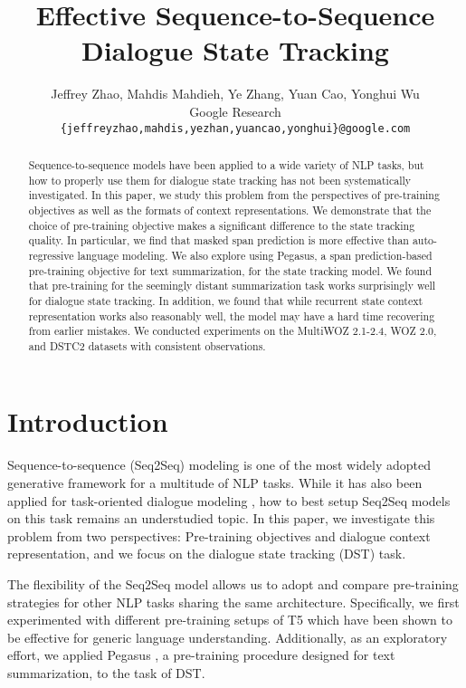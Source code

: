 \documentclass[11pt]{article}
\title{Effective Sequence-to-Sequence Dialogue State Tracking}
\author{Jeffrey Zhao, Mahdis Mahdieh, Ye Zhang, Yuan Cao, Yonghui Wu 
\\
Google Research\\
\texttt{\{jeffreyzhao,mahdis,yezhan,yuancao,yonghui\}@google.com} \\
}
\begin{document}
\maketitle
\begin{abstract}
Sequence-to-sequence models have been applied to a wide variety of NLP tasks, but how to properly use them for dialogue state tracking has not been systematically investigated. In this paper, we study this problem from the perspectives of pre-training objectives as well as the formats of context representations. We demonstrate that the choice of pre-training objective makes a significant difference to the state tracking quality. In particular, we find that masked span prediction is more effective than auto-regressive language modeling. We also explore using Pegasus, a span prediction-based pre-training objective for text summarization, for the state tracking model. We found that pre-training for the seemingly distant summarization task works surprisingly well for dialogue state tracking. In addition, we found that while recurrent state context representation works also reasonably well, the model may have a hard time recovering from earlier mistakes. We conducted experiments on the MultiWOZ 2.1-2.4, WOZ 2.0, and DSTC2 datasets with consistent observations.
\end{abstract}

\section{Introduction}

Sequence-to-sequence (Seq2Seq) modeling \cite{ilya14sequence} is one of the most widely adopted generative framework for a multitude of NLP tasks. While it has also been applied for task-oriented dialogue modeling \cite{wen-etal-2018-sequence,lei-etal-2018-sequicity,subendhu20parse,feng2020sequencetosequence}, how to best setup Seq2Seq models on this task remains an understudied topic. In this paper, we investigate this problem from two perspectives: Pre-training objectives and dialogue context representation, and we focus on the dialogue state tracking (DST) task.

The flexibility of the Seq2Seq model allows us to adopt and compare pre-training strategies for other NLP tasks sharing the same architecture. Specifically, we first experimented with different pre-training setups of T5 \cite{raffel20exploring} which have been shown to be effective for generic language understanding. Additionally, as an exploratory effort, we applied Pegasus \cite{zhang20ae}, a pre-training procedure designed for text summarization, to the task of DST.
\end{document}
